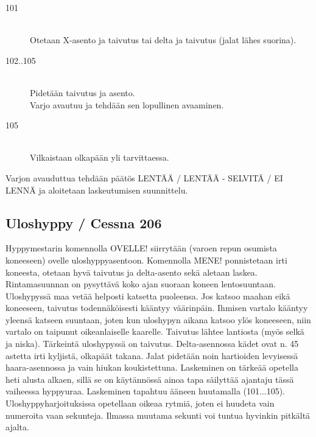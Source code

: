 \begin{description}
\item[101] \hfill \\ 
Otetaan X-asento ja taivutus tai delta ja taivutus (jalat lähes suorina). \hfill \\ 
\end{description}
\begin{description}
\item[102..105] \hfill \\ 
Pidetään taivutus ja asento. \hfill \\ 
Varjo avautuu ja tehdään sen lopullinen avaaminen. \hfill \\ 
\end{description}
\begin{description}
\item[105] \hfill \\ 
Vilkaistaan olkapään yli tarvittaessa. \hfill \\ 
\end{description}

Varjon avauduttua tehdään päätös LENTÄÄ / LENTÄÄ - SELVITÄ / EI LENNÄ ja aloitetaan laskeutumisen suunnittelu. 

\subsection{ Uloshyppy / Cessna 206 }
\label{pl-alkeiskoulutuksen-suoritukset-uloshyppy-cessna-206}


Hyppymestarin komennolla OVELLE! siirrytään (varoen repun osumista koneeseen) ovelle uloshyppyasentoon. Komennolla MENE! ponnistetaan irti koneesta, otetaan hyvä taivutus ja delta-asento sekä aletaan laskea. Rintamasuunnan on pysyttävä koko ajan suoraan koneen lentosuuntaan. Uloshypyssä maa vetää helposti katsetta puoleensa. Jos katsoo maahan eikä koneeseen, taivutus todennäköisesti kääntyy väärinpäin. Ihmisen vartalo kääntyy yleensä katseen suuntaan, joten kun uloshypyn aikana katsoo ylös koneeseen, niin vartalo on taipunut oikeanlaiselle kaarelle. Taivutus lähtee lantiosta (myös selkä ja niska). Tärkeintä uloshypyssä on taivutus. Delta-asennossa kädet ovat n. 45 astetta irti kyljistä, olkapäät takana. Jalat pidetään noin hartioiden levyisessä haara-asennossa ja vain hiukan koukistettuna. Laskeminen on tärkeää opetella heti alusta alkaen, sillä se on käytännössä ainoa tapa säilyttää ajantaju tässä vaiheessa hyppyuraa. Laskeminen tapahtuu ääneen huutamalla (101...105). Uloshyppyharjoituksissa opetellaan oikeaa rytmiä, joten ei huudeta vain numeroita vaan sekunteja. Ilmassa muutama sekunti voi tuntua hyvinkin pitkältä ajalta. 

